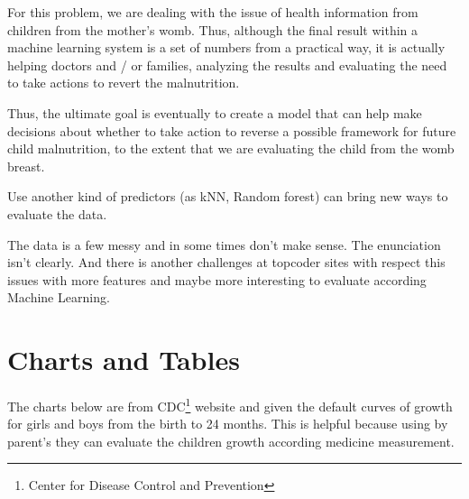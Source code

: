 \documentclass[10pt,twocolumn,letterpaper]{article}
\begin{document}
For this problem, we are dealing with the issue of health information from children from the mother's womb. Thus, although the final result within a machine learning system is a set of numbers from a practical way, it is actually helping doctors and / or families, analyzing the results and evaluating the need to take actions to revert the malnutrition.

Thus, the ultimate goal is eventually to create a model that can help make decisions about whether to take action to reverse a possible framework for future child malnutrition, to the extent that we are evaluating the child from the womb breast.

Use another kind of predictors (as kNN, Random forest) can bring new ways to evaluate the data. 

The data is a few messy and in some times don't make sense. The enunciation isn't clearly. And there is another challenges at topcoder sites with respect this issues with more features and maybe more interesting to evaluate according Machine Learning.

\section{Charts and Tables}
The charts below are from CDC\footnote{Center for Disease Control and Prevention} website and given the default curves of growth for girls and boys from the birth to 24 months. This is helpful because using by parent's they can evaluate the children growth according medicine measurement.




\clearpage

\onecolumn
\end{document}
